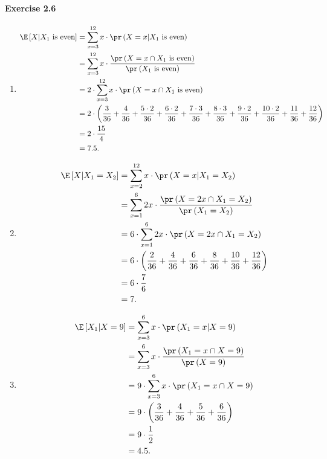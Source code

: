 \paragraph{Exercise 2.6}
\begin{enumerate}
  \item[(a)]
    \begin{align*}
      \E\left[ X | X_1 \text{ is even} \right]
        &= \sum_{x=3}^{12} x \cdot \pr\left( X = x | X_1 \text{ is even} \right) \\
        &= \sum_{x=3}^{12} x \cdot \frac{\pr\left( X = x \cap X_1 \text{ is even} \right)}{\pr\left( X_1 \text{ is even} \right)} \\
        &= 2 \cdot \sum_{x=3}^{12} x \cdot \pr\left( X = x \cap X_1 \text{ is even} \right) \\
        &= 2 \cdot \left( \frac{3}{36} + \frac{4}{36} + \frac{5 \cdot 2}{36} + \frac{6 \cdot 2}{36} + \frac{7 \cdot 3}{36} + \frac{8 \cdot 3}{36} + \frac{9 \cdot 2}{36} + \frac{10 \cdot 2}{36} + \frac{11}{36} + \frac{12}{36} \right) \\
        &= 2 \cdot \frac{15}{4} \\
        &= 7.5.
    \end{align*}

  \item[(b)]
    \begin{align*}
      \E\left[ X | X_1 = X_2 \right]
        &= \sum_{x=2}^{12} x \cdot \pr\left( X = x | X_1 = X_2 \right) \\
        &= \sum_{x=1}^{6} 2x \cdot \frac{\pr\left( X = 2x \cap X_1 = X_2 \right)}{\pr\left( X_1 = X_2 \right)} \\
        &= 6 \cdot \sum_{x=1}^{6} 2x \cdot \pr\left( X = 2x \cap X_1 = X_2 \right) \\
        &= 6 \cdot \left( \frac{2}{36} + \frac{4}{36} + \frac{6}{36} + \frac{8}{36} + \frac{10}{36} + \frac{12}{36} \right) \\
        &= 6 \cdot \frac{7}{6} \\
        &= 7.
    \end{align*}

  \item[(c)]
    \begin{align*}
      \E\left[ X_1 | X = 9 \right]
        &= \sum_{x=3}^{6} x \cdot \pr\left( X_1 = x | X = 9 \right) \\
        &= \sum_{x=3}^{6} x \cdot \frac{\pr\left( X_1 = x \cap X = 9 \right)}{\pr\left( X = 9 \right)} \\
        &= 9 \cdot \sum_{x=3}^{6} x \cdot \pr\left( X_1 = x \cap X = 9 \right) \\
        &= 9 \cdot \left( \frac{3}{36} + \frac{4}{36} + \frac{5}{36} + \frac{6}{36} \right) \\
        &= 9 \cdot \frac{1}{2} \\
        &= 4.5.
    \end{align*}


\end{enumerate}
